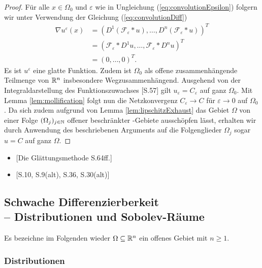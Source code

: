 \begin{proof}
  Für alle $x \in \Omega_0$ und $\varepsilon$ wie in Ungleichung (\ref{eq:convolutionEpsilon}) folgern wir unter Verwendung der Gleichung (\ref{eq:convolutionDiff})
  \begin{align*}
    \nabla u^\varepsilon(x)
    &= (D^1 (\mathcal{F}_\varepsilon \ast u), \dots, D^n (\mathcal{F}_\varepsilon \ast u))^T \\
    &= ( \mathcal{F}_\varepsilon \ast D^1 u, \dots, \mathcal{F}_\varepsilon \ast D^n u)^T \\
    &= (0, \dots, 0)^T.
  \end{align*}
  Es ist $u^\varepsilon$ eine glatte Funktion.
  Zudem ist $\Omega_0$ als offene zusammenhängende Teilmenge von $\mathbb{R}^n$ insbesondere Wegzusammenhängend.
  Ausgehend von der Integraldarstellung des Funktionszuwachses \cite{koenigsberger2004ana2}[S.57] gilt $u_\varepsilon = C_\varepsilon$ auf ganz $\Omega_0$.
  Mit Lemma \ref{lem:mollification} folgt nun die Netzkonvergenz $C_\varepsilon \to C$ für $\varepsilon \to 0$ auf $\Omega_0$.
  Da sich zudem aufgrund von Lemma \ref{lem:lipschitzExhaust} das Gebiet $\Omega$ von einer Folge $(\Omega_j)_{j \in \mathbb{N}}$ offener beschränkter \lipschitz\hyp{}Gebiete ausschöpfen lässt, erhalten wir durch Anwendung des beschriebenen Arguments auf die Folgenglieder $\Omega_j$ sogar $u = C$ auf ganz $\Omega$.
\end{proof}

\begin{itemize}
  \item \cite{sohr2001navier}[Die Glättungsmethode S.64ff.]
  \item \cite{adams2003sobolev}[S.10, S.9(alt), S.36, S.30(alt)]
\end{itemize}

\subsection{Schwache Differenzierberkeit \\-- Distributionen und Sobolev-Räume}
\label{subsec:distributionsSobolev}

Es bezeichne im Folgenden wieder $\Omega \subseteq \mathbb{R}^n$ ein offenes Gebiet mit $n \geq 1$.

\subsubsection{Distributionen}


